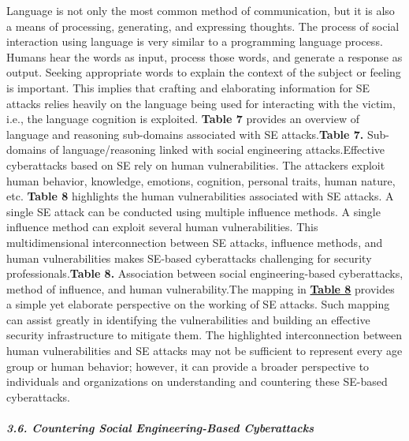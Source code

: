 {Language is not only the most common method of communication, but it is also a means of processing, generating, and expressing thoughts. The process of social interaction using language is very similar to a programming language process. Humans hear the words as input, process those words, and generate a response as output. Seeking appropriate words to explain the context of the subject or feeling is important. This implies that crafting and elaborating information for SE attacks relies heavily on the language being used for interacting with the victim, i.e., the language cognition is exploited. \textbf{Table 7} provides an overview of language and reasoning sub-domains associated with SE attacks.\textbf{Table 7.} Sub-domains of language/reasoning linked with social engineering attacks.Effective cyberattacks based on SE rely on human vulnerabilities. The attackers exploit human behavior, knowledge, emotions, cognition, personal traits, human nature, etc. \textbf{Table 8} highlights the human vulnerabilities associated with SE attacks. A single SE attack can be conducted using multiple influence methods. A single influence method can exploit several human vulnerabilities. This multidimensional interconnection between SE attacks, influence methods, and human vulnerabilities makes SE-based cyberattacks challenging for security professionals.\textbf{Table 8.} Association between social engineering-based cyberattacks, method of influence, and human vulnerability.The mapping in \href{https://www.mdpi.com/2076-3417/12/12/6042\#table_body_display_applsci-12-06042-t008}{\textbf{Table 8}} provides a simple yet elaborate perspective on the working of SE attacks. Such mapping can assist greatly in identifying the vulnerabilities and building an effective security infrastructure to mitigate them. The highlighted interconnection between human vulnerabilities and SE attacks may not be sufficient to represent every age group or human behavior; however, it can provide a broader perspective to individuals and organizations on understanding and countering these SE-based cyberattacks.

\paragraph{\textit{3.6. Countering Social Engineering-Based Cyberattacks}}

}
